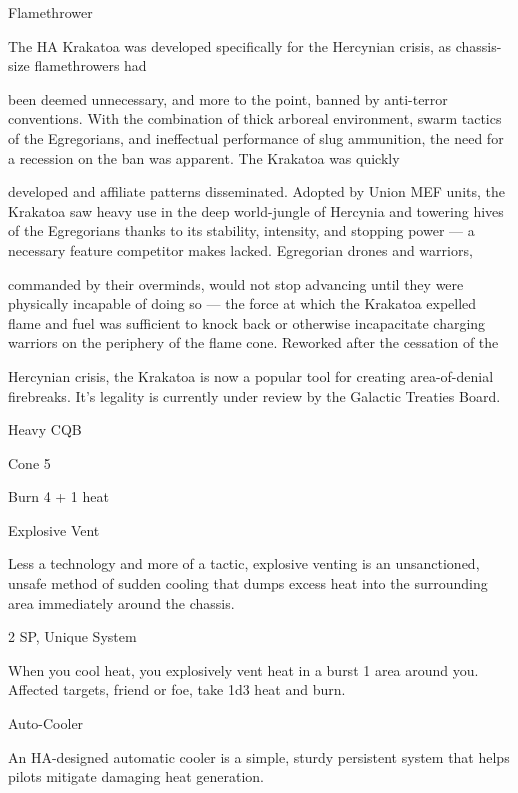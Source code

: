                                                                                                            


Flamethrower  

The HA Krakatoa was developed specifically for the Hercynian crisis, as chassis-size flamethrowers had  

been deemed unnecessary, and more to the point, banned by anti-terror conventions. With the  
combination of thick arboreal environment, swarm tactics of the Egregorians, and ineffectual performance  
of slug ammunition, the need for a recession on the ban was apparent. The Krakatoa was quickly  

developed and affiliate patterns disseminated. Adopted by Union MEF units, the Krakatoa saw heavy use in  
the deep world-jungle of Hercynia and towering hives of the Egregorians thanks to its stability, intensity,  
and stopping power — a necessary feature competitor makes lacked. Egregorian drones and warriors,  

commanded by their overminds, would not stop advancing until they were physically incapable of doing so  
— the force at which the Krakatoa expelled flame and fuel was sufficient to knock back or otherwise  
incapacitate charging warriors on the periphery of the flame cone. Reworked after the cessation of the  

Hercynian crisis, the Krakatoa is now a popular tool for creating area-of-denial firebreaks. It’s legality is  
currently under review by the Galactic Treaties Board.    

Heavy CQB
 
Cone 5
 
Burn 4 + 1 heat
 

Explosive Vent  

Less a technology and more of a tactic, explosive venting is an unsanctioned, unsafe method of sudden  
cooling that dumps excess heat into the surrounding area immediately around the chassis.  

2 SP, Unique  
System  

                                                                                                               


When you cool heat, you explosively vent heat in a burst 1 area around you. Affected targets,  
friend or foe, take 1d3 heat and burn.
 

Auto-Cooler  

An HA-designed automatic cooler is a simple, sturdy persistent system that helps pilots mitigate damaging  
heat generation.   

